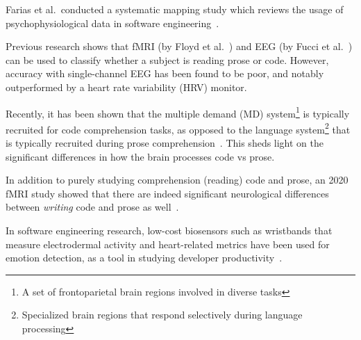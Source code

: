    Farias et al.\ conducted a systematic mapping study which reviews the usage of psychophysiological data in software engineering~\cite{vieira_usage_2021}.

    Previous research shows that fMRI (by Floyd et al.~\cite{floyd_decoding_2017}) and EEG (by Fucci et al.~\cite{fucci_replication_2019}) can be used to classify whether a subject is reading prose or code. However, accuracy with single-channel EEG has been found to be poor, and notably outperformed by a heart rate variability (HRV) monitor.

    Recently, it has been shown that the multiple demand (MD) system\footnote{A set of frontoparietal brain regions involved in diverse tasks} is typically recruited for code comprehension tasks, as opposed to the language system\footnote{Specialized brain regions that respond selectively during language processing} that is typically recruited during prose comprehension~\cite{ivanova_comprehension_2020}. This sheds light on the significant differences in how the brain processes code vs prose.

    In addition to purely studying comprehension (reading) code and prose, an 2020 fMRI study showed that there are indeed significant neurological differences between \emph{writing} code and prose as well~\cite{noauthor_neurological_nodate}.


    In software engineering research, low-cost biosensors such as wristbands that measure electrodermal activity and heart-related metrics have been used for emotion detection, as a tool in studying developer productivity~\cite{girardi_recognizing_2020}. 

